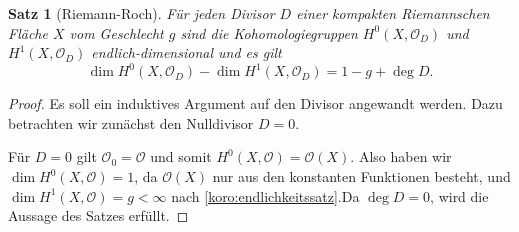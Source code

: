\documentclass[11pt,a4paper]{scrartcl}
\theoremstyle{thm}
\newtheorem{satz}{Satz}[section]
\theoremstyle{def}
\theoremstyle{remark}
\begin{document}
\begin{satz}[Riemann-Roch]
Für jeden Divisor $D$ einer kompakten Riemannschen Fläche $X$ vom Geschlecht $g$ sind die Kohomologiegruppen $H^0(X,\mathcal{O}_D)$ und $H^1(X,\mathcal{O}_D)$ endlich-dimensional und es gilt
\[
\dim H^0(X,\mathcal{O}_D)-\dim H^1(X,\mathcal{O}_D)=1-g+\deg D.
\]
\end{satz}
\begin{proof}
	Es soll ein induktives Argument auf den Divisor angewandt werden. Dazu betrachten wir zunächst den Nulldivisor $D=0$.
	
	Für $D=0$ gilt $\mathcal{O}_0=\mathcal{O}$ und somit $H^0(X,\mathcal{O})=\mathcal{O}(X)$. Also haben wir $\dim H^0(X,\mathcal{O})=1$, da $\mathcal{O}(X)$ nur aus den konstanten Funktionen besteht\cite[S. 10]{forster}, und $\dim H^1(X,\mathcal{O})=g<\infty$ nach \ref{koro:endlichkeitssatz}.Da $\deg D=0$, wird die Aussage des Satzes erfüllt.
	

\end{proof}
\end{document}
